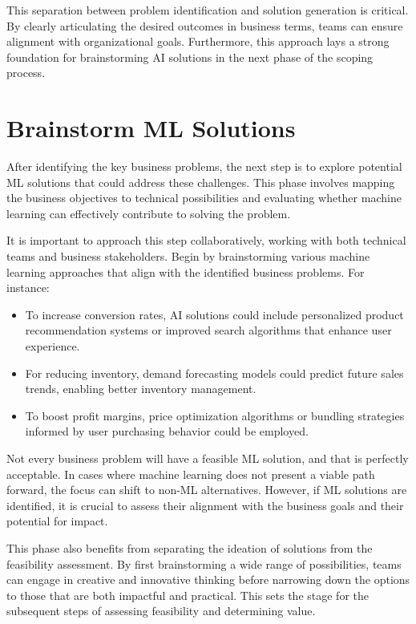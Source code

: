 \documentclass[12pt,openany]{book}
\begin{document}
This separation between problem identification and solution generation is critical. By clearly articulating the desired outcomes in business terms, teams can ensure alignment with organizational goals. Furthermore, this approach lays a strong foundation for brainstorming AI solutions in the next phase of the scoping process.


\section{Brainstorm ML Solutions}

After identifying the key business problems, the next step is to explore potential ML solutions that could address these challenges. This phase involves mapping the business objectives to technical possibilities and evaluating whether machine learning can effectively contribute to solving the problem.
\newline

It is important to approach this step collaboratively, working with both technical teams and business stakeholders. Begin by brainstorming various machine learning approaches that align with the identified business problems. For instance:
\begin{itemize}
    \item To increase conversion rates, AI solutions could include personalized product recommendation systems or improved search algorithms that enhance user experience.
    \item For reducing inventory, demand forecasting models could predict future sales trends, enabling better inventory management.
    \item To boost profit margins, price optimization algorithms or bundling strategies informed by user purchasing behavior could be employed.
\end{itemize}

Not every business problem will have a feasible ML solution, and that is perfectly acceptable. In cases where machine learning does not present a viable path forward, the focus can shift to non-ML alternatives. However, if ML solutions are identified, it is crucial to assess their alignment with the business goals and their potential for impact.

This phase also benefits from separating the ideation of solutions from the feasibility assessment. By first brainstorming a wide range of possibilities, teams can engage in creative and innovative thinking before narrowing down the options to those that are both impactful and practical. This sets the stage for the subsequent steps of assessing feasibility and determining value.
\end{document}
